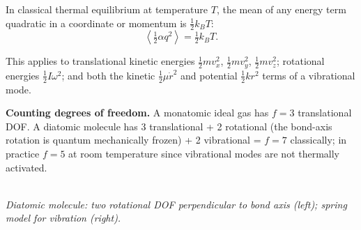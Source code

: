 \begin{theorem}
In classical thermal equilibrium at temperature $T$, the mean of any energy term quadratic in a coordinate or momentum is $\tfrac{1}{2}k_BT$:
\begin{equation}
    \left\langle\tfrac{1}{2}\alpha q^2\right\rangle = \tfrac{1}{2}k_BT.
\end{equation}
\end{theorem}

This applies to translational kinetic energies $\tfrac{1}{2}mv_x^2$, $\tfrac{1}{2}mv_y^2$, $\tfrac{1}{2}mv_z^2$; rotational energies $\tfrac{1}{2}I\omega^2$; and both the kinetic $\tfrac{1}{2}\mu\dot{r}^2$ and potential $\tfrac{1}{2}kr^2$ terms of a vibrational mode.

\textbf{Counting degrees of freedom.} A monatomic ideal gas has $f = 3$ translational DOF. A diatomic molecule has 3 translational + 2 rotational (the bond-axis rotation is quantum mechanically frozen) + 2 vibrational = $f = 7$ classically; in practice $f = 5$ at room temperature since vibrational modes are not thermally activated.

\begin{center}
\\[3pt]
{\small\itshape Diatomic molecule: two rotational DOF perpendicular to bond axis (left); spring model for vibration (right).}
\end{center}

